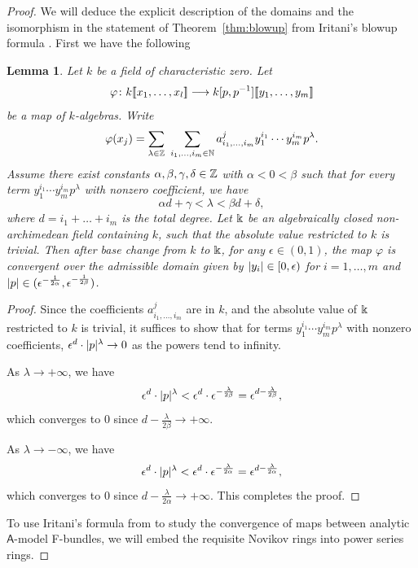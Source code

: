 \documentclass[twoside,leqno]{article}
\numberwithin{equation}{section}
\theoremstyle{plain}
\newtheorem{lemma}[equation]{Lemma}
\theoremstyle{definition}
\begin{document}
\begin{proof}
We will deduce the explicit description of the domains and the isomorphism in the statement of Theorem~\ref{thm:blowup} from Iritani's blowup formula \cite{Iritani_blowup}. 
First we have the following

\begin{lemma} \label{lem:convergence}
  Let $k$ be a field of characteristic zero.
  Let
  \[ \varphi \colon k[\![x_1, \dots, x_l]\!] \longrightarrow k[p, p^{-1}][\![y_1, \dots, y_m]\!] \]
  be a map of $k$-algebras.
  Write
  \[ \varphi(x_j) = \sum_{\lambda \in \mathbb Z} \ \sum_{i_1, \dots, i_m \in \mathbb N} a^j_{i_1, \dots, i_m} y_1^{i_1} \cdots y_m^{i_m} p^\lambda .\]
  Assume there exist constants $\alpha, \beta, \gamma, \delta \in \mathbb Z$ with $\alpha < 0 < \beta$ such that for every term $y_1^{i_1} \cdots y_m^{i_m} p^\lambda$ with nonzero coefficient, we have
  \[ \alpha d + \gamma < \lambda < \beta d + \delta, \]
  where $d = i_1 + \dots + i_m$ is the total degree.
  Let $\Bbbk$ be an algebraically closed non-archimedean field containing $k$, such that the absolute value restricted to $k$ is trivial.
  Then after base change from $k$ to $\Bbbk$, for any $\epsilon \in (0, 1)$, the map $\varphi$ is convergent over the admissible domain given by $\lvert y_i\rvert \in [0, \epsilon)$ for $i = 1, \dots, m$ and $\lvert p\rvert \in (\epsilon^{-\frac{1}{2\alpha}}, \epsilon^{-\frac{1}{2\beta}})$.
\end{lemma}
\begin{proof}
  Since the coefficients $a^j_{i_1, \dots, i_m}$ are in $k$, and the absolute value of $\Bbbk$ restricted to $k$ is trivial, it suffices to show that for terms $y_1^{i_1} \cdots y_m^{i_m} p^\lambda$ with nonzero coefficients, $\epsilon^d \cdot \lvert p\rvert^\lambda \to 0$ as the powers tend to infinity.

  As $\lambda \to +\infty$, we have
  \[ \epsilon^d \cdot \lvert p\rvert^\lambda < \epsilon^d \cdot \epsilon^{-\frac{\lambda}{2\beta}} = \epsilon^{d - \frac{\lambda}{2\beta}}, \]
  which converges to $0$ since $d - \frac{\lambda}{2\beta} \to +\infty$.

  As $\lambda \to -\infty$, we have
  \[ \epsilon^d \cdot \lvert p\rvert^\lambda < \epsilon^d \cdot \epsilon^{-\frac{\lambda}{2\alpha}} = \epsilon^{d - \frac{\lambda}{2\alpha}}, \]
  which converges to $0$ since $d - \frac{\lambda}{2\alpha} \to +\infty$.
  This completes the proof.
\end{proof}



To use Iritani's formula from \cite{Iritani_blowup} to study the convergence of maps between analytic $\mathsf{A}$-model F-bundles, we will embed the requisite Novikov rings into power series rings.


\end{proof}
\end{document}
